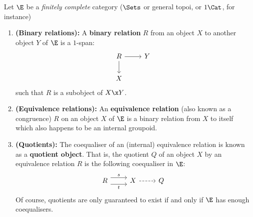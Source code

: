             \begin{definition} \label{def: equivalence_relations}
                Let $\E$ be a \textit{finitely complete} category ($\Sets$ or general topoi, or $1\-\Cat$, for instance)
                    \begin{enumerate}
                        \item \textbf{(Binary relations):} A \textbf{binary relation} $R$ from an object $X$ to another object $Y$ of $\E$ is a $1$-span:
                            $$
                                \begin{tikzcd}
                                	R & Y \\
                                	X
                                	\arrow[from=1-1, to=2-1]
                                	\arrow[from=1-1, to=1-2]
                                \end{tikzcd}
                            $$
                        such that $R$ is a subobject of $X \x Y$. 
                        \item \textbf{(Equivalence relations):} An \textbf{equivalence relation} (also known as a congruence) $R$ on an object $X$ of $\E$ is a binary relation from $X$ to itself which also happens to be an internal groupoid. 
                        \item \textbf{(Quotients):} The coequaliser of an (internal) equivalence relation is known as a \textbf{quotient object}. That is, the quotient $Q$ of an object $X$ by an equivalence relation $R$ is the following coequaliser in $\E$:
                            $$
                                \begin{tikzcd}
                                	R & X & Q
                                	\arrow["s", shift left=2, from=1-1, to=1-2]
                                	\arrow["t"', shift right=2, from=1-1, to=1-2]
                                	\arrow[dashed, from=1-2, to=1-3]
                                \end{tikzcd}
                            $$
                        Of course, quotients are only guaranteed to exist if and only if $\E$ has enough coequalisers. 
                    \end{enumerate}
            \end{definition}
        
